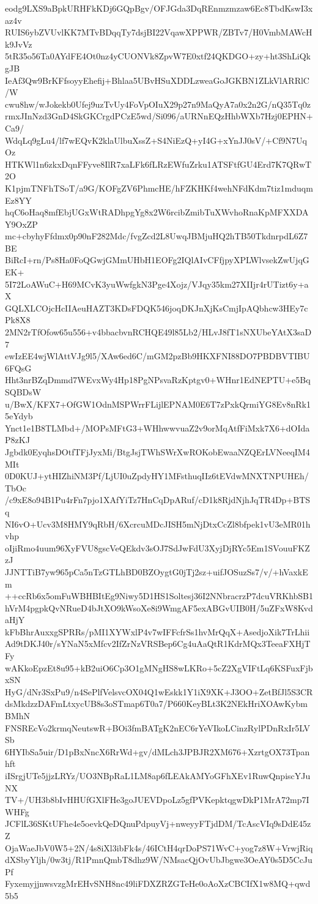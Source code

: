 eodg9LXS9aBpkURHFkKDj6GQpBgv/OFJGda3DqREnmzmzaw6Ec8TbdKswI3xaz4v
RUIS6ybZVUvlKK7MTvBDqqTy7dsjBI22VqawXPPWR/ZBTv7/H0VmbMAWcHk9JvVz
5tR35o56Ta0AYdFE4Ot0nz4yCUONVk8ZpvW7E0xtf24QKDGO+zy+ht3ShLiQkgJB
IeAf3Qw9BrKFfsoyyEhefij+Bhlaa5UBvHSuXDDLzweaGoJGKBN1ZLkVlARRlC/W
cwu8hw/wJokekb0Ufej9uzTvUy4FoVpOIuX29p27n9MaQyA7a0x2n2G/nQ35Tq0z
rmxJInNzd3GnD4SkGKCrgdPCzE5wd/Si096/aURNnEQzHhbWXb7Hzj0EPHN+Ca9/
WdqLq9gLu4/lf7wEQvK2klaUlbuXssZ+S4NiEzQ+yI4G+xYnJJ0sV/+Cf9N7UqOz
HTKWl1n6zkxDqnFFyve8IlR7xaLFk6fLRzEWfuZrku1ATSFtfGU4Erd7K7QRwT2O
K1pjmTNFhTSoT/a9G/KOFgZV6PhmcHE/hFZKHKf4wehNFdKdm7tiz1mduqmEz8YY
hqC6oHaq8mfEbjUGxWtRADhpgYg8x2W6rcibZmibTuXWvhoRnaKpMFXXDAY9OxZP
mc+cbyhyFfdmx0p90nF282Mdc/fvgZcd2L8UwqJBMjuHQ2hTB50TkdnrpdL6Z7BE
BiRcI+rn/Ps8Ha0FoQGwjGMmUHbH1EOFg2IQlAIvCFfjpyXPLWlvsekZwUjqGEK+
5I72LoAWuC+H69MCvK3yuWwfgkN3Pge4Xojz/VJqy35km27XIIjr4rUTizt6y+aX
GQLXLCOjcHcIIAeuHAZT3KDsFDQK546joqDKJnXjKsCmjIpAQbhcw3HEy7cPk8X8
2MN2rTfOfow65u556+v4bbacbvnRCHQE49l85Lb2/HLvJ8fT1sNXUbeYAtX3saD7
ewIzEE4wjWlAttVJg9l5/XAw6ed6C/mGM2pzBb9HKXFNI88DO7PBDBVTIBU6FQsG
Hht3nrBZqDmmd7WEvxWy4Hp18PgNPsvaRzKptgv0+WHnr1EdNEPTU+e5BqSQBDsW
u/BwX/KFX7+OfGW1OdnMSPWrrFLijlEPNAM0E6T7zPxkQrmiYG8Ev8nRk15eYdyb
Ynct1e1B8TLMbd+/MOPsMFtG3+WHhwwvuaZ2v9orMqAtfFiMxk7X6+dOIdaP8zKJ
Jgbdk0EyqhsDOtfTFjJyxMi/BtgJsjTWhSWrXwROKobEwaaNZQErLVNeeqIM4MIt
0D0KUJ+ytHIZhiNM3Pf/LjUI0uZpdyHY1MFsthuqIIz6tEVdwMNXTNPUHEh/TbOc
/c9xE8o94B1Pu4rFn7pjo1XAfYiTz7HnCqDpARuf/cD1k8RjdNjhJqTR4Dp+BTSq
NI6vO+Ucv3M8HMY9qRbH/6XcrcuMDcJISH5mNjDtxCcZl8bfpek1vU3eMR01hvhp
oIjiRmo4uum96XyFVU8gscVeQEkdv3sOJ7SdJwFdU3XyjDjRYc5Em1SVouuFKZzJ
JJNTTiB7yw965pCa5nTzGTLhBD0BZOygtG0jTj2sz+uifJOSuzSs7/v/+hVaxkEm
++ccRb6x5omFuWBHBItEg9Niwy5D1HS1Soltesj36I2NNbracrzP7dcuVRKhbSB1
hVrM4pgpkQvNRueD4bJtXO9kWsoXe8i9WmgAF5exABGvUIB0H/5uZFxW8KvdaHjY
kFbBhrAuxxgSPRRs/pMI1XYWxlP4v7wIFFcfrSs1hvMrQqX+AsedjoXik7TrLhii
Ad9tDKJ40r/sYNaN5xMfcv2IfZrNzVRSBep6Cg4uAaQtR1KdrMQx3TeeaFXHjTFy
wAKkoEpzEt8u95+kB2uiO6Cp3O1gMNgHS8wLKRo+5cZ2XgVIFtLq6KSFuxFjbxSN
HyG/dNr3SxPu9/n4SePlfVelsvcOX04Q1wEskk1Y1iX9XK+J3OO+ZetBfJl5S3CR
dsMkdzzDAFmLtxycUB8s3oSTmap6T0a7/P660KeyBLt3K2NEkHriXOAwKybmBMhN
FNSREcVo2krmqNeutswR+BOi3fmBATgK2nEC6rYeVIkoLCinzRylPDnRxIr5LVSb
6HYIbSa5uir/D1pBxNncX6RrWd+gv/dMLch3JPBJR2XM676+XzrtgOX73Tpanhft
iISrgjUTe5jjzLRYz/UO3NBpRaL1LM8ap6fLEAkAMYoGFhXEv1RuwQnpiscYJuNX
TV+/UH3b8bIvHHUfGXlFHe3goJUEVDpoLz5gfPVKepktqgwDkP1MrA72mp7IWHFg
JCFlL36SKtUFhe4e5oevkQeDQnuPdpuyVj+nweyyFTjdDM/TcAscVIq9sDdE45zZ
OjaWaeJbV0W5+2N/4s8iXl3ibFk4s/46ICtH4qrDoPS71WvC+yog7z8W+VrwjRiq
dXSbyYljh/0w3tj/R1PmnQmbT8dhz9W/NMsacQjOvUbJbgwe3OeAY0s5D5CcJuPf
FyxemyjjnwsvzgMrEHvSNH8nc49liFDXZRZGTeHe0oAoXzCBCIfX1w8MQ+qwd5b5
